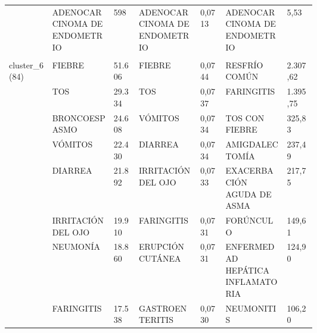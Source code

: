 \begin{landscape}
\begin{longtable}[c]{@{}lp{0.2\linewidth}lp{0.2\linewidth}lp{0.2\linewidth}l@{}}
                                  & ADENOCARCINOMA DE ENDOMETRIO                                  & 598    & ADENOCARCINOMA DE ENDOMETRIO                           & 0,0713 & ADENOCARCINOMA DE ENDOMETRIO                                  & 5,53     \\ \\
\multirow{10}{*}{cluster\_6(84)}  & FIEBRE                                                        & 51.606 & FIEBRE                                                 & 0,0744 & RESFRÍO COMÚN                                                 & 2.307,62 \\
                                  & TOS                                                           & 29.334 & TOS                                                    & 0,0737 & FARINGITIS                                                    & 1.395,75 \\
                                  & BRONCOESPASMO                                                 & 24.608 & VÓMITOS                                                & 0,0734 & TOS CON FIEBRE                                                & 325,83   \\
                                  & VÓMITOS                                                       & 22.430 & DIARREA                                                & 0,0734 & AMIGDALECTOMÍA                                                & 237,49   \\
                                  & DIARREA                                                       & 21.892 & IRRITACIÓN DEL OJO                                     & 0,0733 & EXACERBACIÓN AGUDA DE ASMA                                    & 217,75   \\
                                  & IRRITACIÓN DEL OJO                                            & 19.910 & FARINGITIS                                             & 0,0731 & FORÚNCULO                                                     & 149,61   \\
                                  & NEUMONÍA                                                      & 18.860 & ERUPCIÓN CUTÁNEA                                       & 0,0731 & ENFERMEDAD HEPÁTICA INFLAMATORIA                              & 124,90   \\
                                  & FARINGITIS                                                    & 17.538 & GASTROENTERITIS                                        & 0,0730 & NEUMONITIS                                                    & 106,20   \\

\end{longtable}
\end{landscape}
